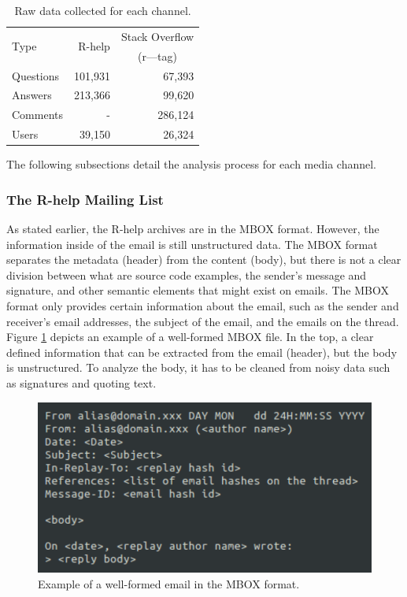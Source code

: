 \documentclass{sig-alternate-05-2015}
\begin{document}
	\begin{table}[!htb]
		\caption{Raw data collected for each channel.}
		\begin{center}
			\begin{tabular}{lrr}
				\toprule
				\multirow{2}{*}{Type} & \multirow{2}{*}{R-help} & Stack Overflow \\
				                      &                         & \multicolumn{1}{c}{(r---tag)}\\
				\midrule
				Questions     & 101,931 &  67,393 \\
				Answers       & 213,366 &  99,620 \\
				Comments      &       - & 286,124 \\
				Users         &  39,150 &  26,324 \\
				\bottomrule
			\end{tabular} 
		\end{center}
		\label{table:data}
	\end{table}

	The following subsections detail the analysis process for each media channel.

\subsubsection*{The R-help Mailing List}
\label{subsec:r-help}

	As stated earlier, the R-help archives are in the MBOX format. 
	However, the information inside of the email is still unstructured data.
	The MBOX format separates the metadata (header) from the content (body), but there is not a clear division between what are source code examples, the sender's message and signature, and other semantic elements that might exist on emails.
	The MBOX format only provides certain information about the email, such as the sender and receiver's email addresses, the subject of the email, and the emails on the thread.
	Figure \ref{fig:WellFormedEmail} depicts an example of a well-formed MBOX file.
	In the top, a clear defined information that can be extracted from the email (header), but the body is unstructured. To analyze the body, it has to be cleaned from noisy data such as signatures and quoting text.

	\begin{figure}[!htb]
		\centering
		\includegraphics[width=0.8\columnwidth]{Figures/WellFormedEmail}
		\caption[Example of a well-formed MBOX file]{Example of a well-formed email in the MBOX format.}
		\label{fig:WellFormedEmail}
	\end{figure}
\end{document}
